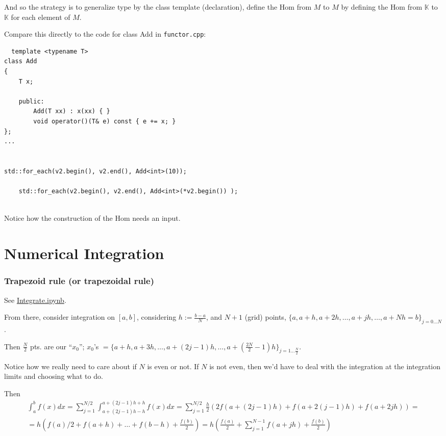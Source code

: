 \documentclass[10pt]{amsart}
\begin{document}
\begin{multicols*}{2}
And so the strategy is to generalize type by the class template (declaration), define the $\text{Hom}$ from $M$ to $M$ by defining the $\text{Hom}$ from $\mathbb{K}$ to $\mathbb{K}$ for each element of $M$.  

Compare this directly to the code for class Add in \verb|functor.cpp|:
\begin{lstlisting}
  template <typename T>
class Add
{
	T x;
	
	public:
		Add(T xx) : x(xx) { } 
		void operator()(T& e) const { e += x; }
};
...


std::for_each(v2.begin(), v2.end(), Add<int>(10));

	std::for_each(v2.begin(), v2.end(), Add<int>(*v2.begin()) );
        
\end{lstlisting}
Notice how the construction of the $\text{Hom}$ needs an input.  


\section{Numerical Integration}

\subsubsection{Trapezoid rule (or trapezoidal rule)}

See \href{https://github.com/ernestyalumni/CompPhys/blob/master/Cpp/Integrate.ipynb}{Integrate.ipynb}.

From there, consider integration on $[a,b]$, considering $h := \frac{b-a}{N}$, and $N+1$ (grid) points, $\lbrace a, a+h, a+2h, \dots , a+ jh, \dots , a+Nh = b\rbrace_{j=0 \dots N }$.

Then $\frac{N}{2}$ pts. are our ``$x_0$''; $x_0$'s $= \lbrace a +h , a+3h, \dots , a+(2j-1)h, \dots , a+ \left( \frac{2 N}{2} - 1 \right)h \rbrace_{j=1 \dots \frac{N}{2} }$.

Notice how we really need to care about if $N$ is even or not.  If $N$ is not even, then we'd have to deal with the integration at the integration limits and choosing what to do.  

Then
\[
\begin{gathered}
  \int_a^b f(x) dx = \sum_{j=1}^{N/2} \int_{a + (2j-1)h-h}^{a+(2j-1)h+h} f(x)dx = \sum_{j=1}^{N/2} \frac{h}{2} ( 2f(a+(2j-1)h ) + f(a+2(j-1)h) + f(a+2jh) ) = \\
   = h(f(a)/2 + f(a+h) + \dots + f(b-h) + \frac{f(b)}{2} ) = h \left( \frac{f(a)}{2} + \sum_{j=1}^{N-1} f(a+jh) + \frac{f(b)}{2} \right)
  \end{gathered}
\]


\end{multicols*}
\end{document}
